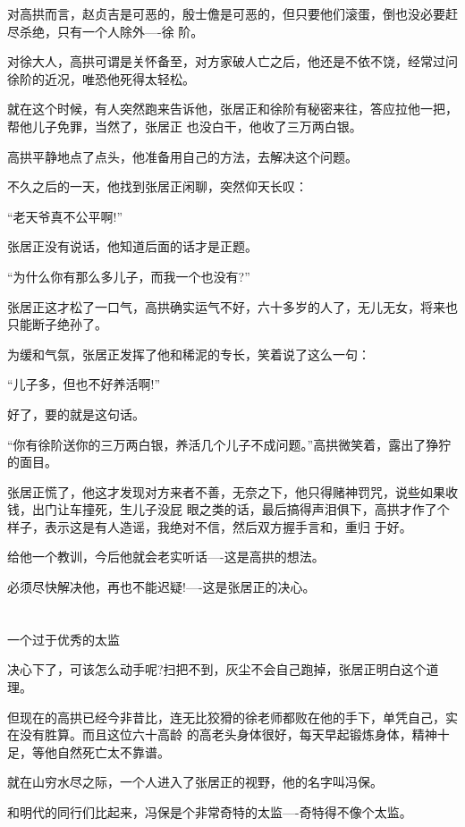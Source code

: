 \documentclass[11pt,a4paper,onecolumn]{article}
\begin{document}
对高拱而言，赵贞吉是可恶的，殷士儋是可恶的，但只要他们滚蛋，倒也没必要赶尽杀绝，只有一个人除外----徐
阶。

对徐大人，高拱可谓是关怀备至，对方家破人亡之后，他还是不依不饶，经常过问徐阶的近况，唯恐他死得太轻松。

就在这个时候，有人突然跑来告诉他，张居正和徐阶有秘密来往，答应拉他一把，帮他儿子免罪，当然了，张居正
也没白干，他收了三万两白银。

高拱平静地点了点头，他准备用自己的方法，去解决这个问题。

不久之后的一天，他找到张居正闲聊，突然仰天长叹：

``老天爷真不公平啊!''

张居正没有说话，他知道后面的话才是正题。

``为什么你有那么多儿子，而我一个也没有?''

张居正这才松了一口气，高拱确实运气不好，六十多岁的人了，无儿无女，将来也只能断子绝孙了。

为缓和气氛，张居正发挥了他和稀泥的专长，笑着说了这么一句：

``儿子多，但也不好养活啊!''

好了，要的就是这句话。

``你有徐阶送你的三万两白银，养活几个儿子不成问题。''高拱微笑着，露出了狰狞的面目。

张居正慌了，他这才发现对方来者不善，无奈之下，他只得赌神罚咒，说些如果收钱，出门让车撞死，生儿子没屁
眼之类的话，最后搞得声泪俱下，高拱才作了个样子，表示这是有人造谣，我绝对不信，然后双方握手言和，重归
于好。

给他一个教训，今后他就会老实听话----这是高拱的想法。

必须尽快解决他，再也不能迟疑!----这是张居正的决心。

\section[\thesection]{}

一个过于优秀的太监

决心下了，可该怎么动手呢?扫把不到，灰尘不会自己跑掉，张居正明白这个道理。

但现在的高拱已经今非昔比，连无比狡猾的徐老师都败在他的手下，单凭自己，实在没有胜算。而且这位六十高龄
的高老头身体很好，每天早起锻炼身体，精神十足，等他自然死亡太不靠谱。

就在山穷水尽之际，一个人进入了张居正的视野，他的名字叫冯保。

和明代的同行们比起来，冯保是个非常奇特的太监----奇特得不像个太监。
\end{document}

